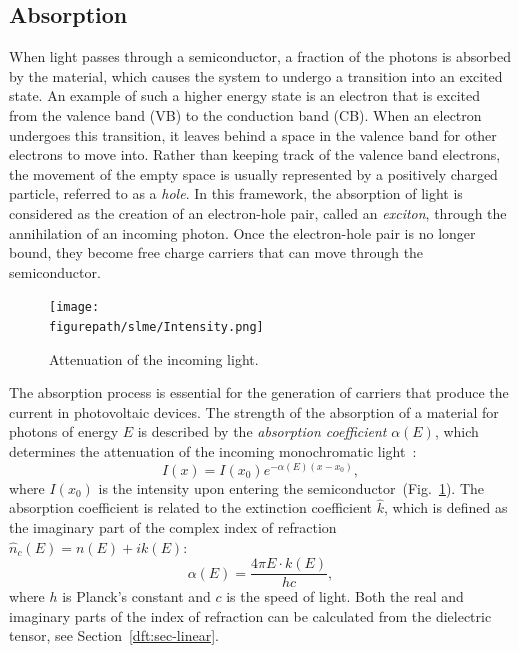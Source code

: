 \begin{refsection}
\subsection{Absorption}\label{slme:sec-absorption} 
 
When light passes through a semiconductor, a fraction of the photons is 
absorbed by the material, which causes the system to undergo a transition into 
an excited state. An example of such a higher energy state is an electron that 
is excited from the valence band (VB) to the conduction band (CB). When an 
electron undergoes this transition, it leaves behind a space in the valence 
band for other electrons to move into. Rather than keeping track of the 
valence band electrons, the movement of the empty space is usually represented 
by a positively charged particle, referred to as a \textit{hole}. In this 
framework, the absorption of light is considered as the creation of an 
electron-hole pair, called an \textit{exciton}, through the annihilation of an 
incoming photon. Once the electron-hole pair is no longer bound, they become 
free charge carriers that can move through the semiconductor. 
 
\begin{figure}
\centering 
\captionsetup{width=0.35\textwidth} 
\texttt{[image: \\figurepath/slme/Intensity.png]} 
\caption{\label{slme:fig-intensity} Attenuation of the incoming light.} 
\end{figure} 
 
The absorption process is essential for the generation of carriers that 
produce the current in photovoltaic devices. The strength of the absorption of 
a material for photons of energy $E$ is described by the \textit{absorption 
coefficient} $\alpha(E)$, which determines the attenuation of the incoming 
monochromatic light~\cite{Green1981}: 
\begin{equation}\label{slme:eq-intensity} 
I(x) = I(x_0)e^{-\alpha(E) (x - x_0)}, 
\end{equation} 
where $I(x_0)$ is the intensity upon entering the 
semiconductor~(Fig.~\ref{slme:fig-intensity}). The absorption coefficient is 
related to the extinction coefficient $\hat{k}$, which is defined as the 
imaginary part of the complex index of refraction $\hat{n}_c(E)=n(E)+ik(E)$: 
\begin{equation}\label{slme:eq-absorption} 
\alpha (E)= \frac{4 \pi E \cdot k(E)}{h c}, 
\end{equation} 
where $h$ is Planck's constant and $c$ is the speed of light. Both the real 
and imaginary parts of the index of refraction can be calculated from the 
dielectric tensor, see Section~\ref{dft:sec-linear}. 
 

\end{refsection}
